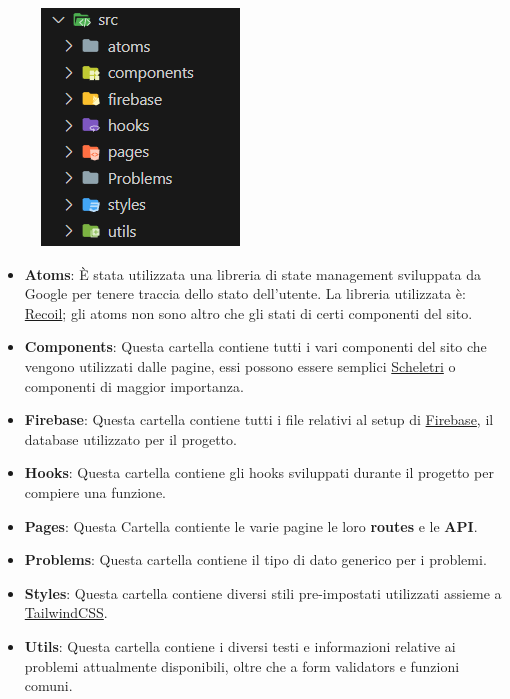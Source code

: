 \documentclass[11pt, a4paper]{article}
\theoremstyle{definition}
\begin{document}
\begin{figure}[H]
  \centering
  \includegraphics[scale = 1.2]{materiale/src.png}
\end{figure}

\begin{itemize}
  \item \textbf{Atoms}: È stata utilizzata una libreria di state management sviluppata da Google per tenere traccia dello stato dell'utente. La libreria utilizzata è: \href{https://recoiljs.org/}{Recoil}; gli atoms non sono altro che gli stati di certi componenti del sito.
  \item \textbf{Components}: Questa cartella contiene tutti i vari componenti del sito che vengono utilizzati dalle pagine, essi possono essere semplici \href{https://www.nngroup.com/articles/skeleton-screens/}{Scheletri} o componenti di maggior importanza.
  \item \textbf{Firebase}: Questa cartella contiene tutti i file relativi al setup di \href{https://firebase.google.com/}{Firebase}, il database utilizzato per il progetto.
  \item \textbf{Hooks}: Questa cartella contiene gli hooks sviluppati durante il progetto per compiere una funzione.
  \item \textbf{Pages}: Questa Cartella contiente le varie pagine le loro \textbf{routes} e le \textbf{API}.
  \item \textbf{Problems}: Questa cartella contiene il tipo di dato generico per i problemi.
  \item \textbf{Styles}: Questa cartella contiene diversi stili pre-impostati utilizzati assieme a \href{https://tailwindcss.com/}{TailwindCSS}.
  \item \textbf{Utils}: Questa cartella contiene i diversi testi e informazioni relative ai problemi attualmente disponibili, oltre che a form validators e funzioni comuni.
\end{itemize}
\end{document}
